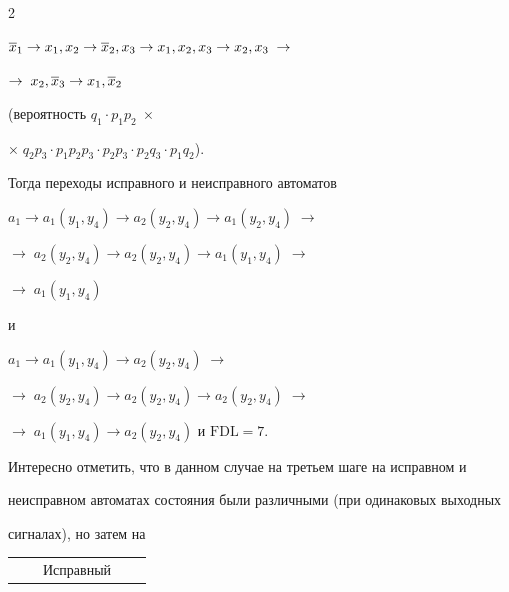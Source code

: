 \begin{multicols}{2}
\begin{enumerate}[(1)]
$\o x_1 \to x_1,x_2 \to \o x_2,x_3 \to x_1,x_2,x_3 \to


x_2,x_3\; \to$\linebreak


 $\to\; x_2,\overline x_3 \to x_1,\overline x_2$


(вероятность $q_1 \cdot p_1 p_2\; \times$\linebreak


$\times\; q_2 p_3 \cdot


p_1 p_2 p_3 \cdot p_2 p_3 \cdot p_2 q_3 \cdot p_1 q_2$).


Тогда переходы исправного и неисправного автоматов


$a_1 \to a_1(y_1,y_4) \to a_2(y_2,y_4) \to a_1(y_2,y_4)\;\to$\linebreak


$\to\; a_2(y_2,y_4) \to a_2(y_2,y_4) \to a_1(y_1,y_4)\;\to$\linebreak


$\to\; a_1(y_1,y_4)$


и


$a_1 \to a_1(y_1,y_4) \to a_2(y_2,y_4)\; \to$\linebreak


$\to\; a_2(y_2,y_4) \to a_2(y_2,y_4)


\to a_2(y_2,y_4)\;\to$\linebreak


$\to\;a_1(y_1,y_4) \to a_2(y_2,y_4)$ и $\mathrm{FDL} = 7$.


Интересно отметить, что в данном случае на третьем шаге на исправном и


неисправном автоматах состояния были различными (при одинаковых выходных


сигналах), но затем на


\begin{table}\small %


\begin{center}




\vspace*{2ex}





\begin{tabular}{|c|c|c|c|c|c|}


\hline


 & &


\multicolumn{2}{|c|}{ Исправный} &



\end{tabular}
\end{center}
\end{table}
\end{enumerate}
\end{multicols}
